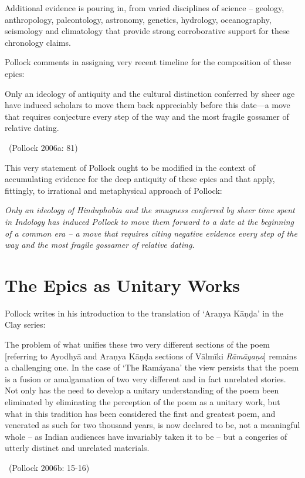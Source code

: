 Additional evidence is pouring in, from varied disciplines of science – geology, anthropology, paleontology, astronomy, genetics, hydrology, oceanography, seismology and climatology that provide strong corroborative support for these chronology claims.

Pollock comments in assigning very recent timeline for the composition of these epics:

\begin{myquote}
Only an ideology of antiquity and the cultural distinction conferred by sheer age have induced scholars to move them back appreciably before this date—a move that requires conjecture every step of the way and the most fragile gossamer of relative dating. 

~\hfill (Pollock 2006a: 81)
\end{myquote}

This very statement of Pollock ought to be modified in the context of accumulating evidence for the deep antiquity of these epics and that apply, fittingly, to irrational and metaphysical approach of Pollock:

\textit{Only an ideology of Hinduphobia and the smugness conferred by sheer time spent in Indology has induced Pollock to move them forward to a date at the beginning of a common era – a move that requires citing negative evidence every step of the way and the most fragile gossamer of relative dating.}


\section*{The Epics as Unitary Works}

Pollock writes in his introduction to the translation of ‘Araṇya Kāṇḍa’ in the Clay series:

\begin{myquote}
The problem of what unifies these two very different sections of the poem [referring to Ayodhyā and Araṇya Kāṇḍa sections of Vālmīki \textit{Rāmāyaṇa}] remains a challenging one. In the case of ‘The Ramáyana’ the view persists that the poem is a fusion or amalgamation of two very different and in fact unrelated stories. Not only has the need to develop a unitary understanding of the poem been eliminated by eliminating the perception of the poem as a unitary work, but what in this tradition has been considered the first and greatest poem, and venerated as such for two thousand years, is now declared to be, not a meaningful whole – as Indian audiences have invariably taken it to be – but a congeries of utterly distinct and unrelated materials. 

~\hfill (Pollock 2006b: 15-16)
\end{myquote}


